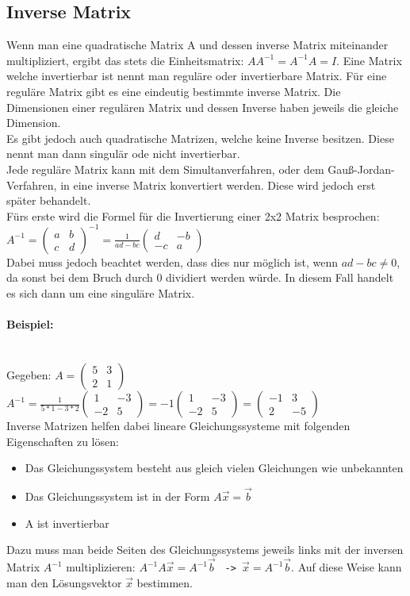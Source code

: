 \documentclass{article}
\newcommand{\paragraphlb}[1]{\paragraph{#1}\mbox{}\\}
\begin{document}
	\subsection{Inverse Matrix}
	Wenn man eine quadratische Matrix A und dessen inverse Matrix miteinander multipliziert, ergibt das stets die Einheitsmatrix: $AA^{-1}=A^{-1}A=I$. Eine Matrix welche invertierbar ist nennt man reguläre oder invertierbare Matrix. Für eine reguläre Matrix gibt es eine eindeutig bestimmte inverse Matrix. Die Dimensionen einer regulären Matrix und dessen Inverse haben jeweils die gleiche Dimension. \\
	Es gibt jedoch auch quadratische Matrizen, welche keine Inverse besitzen. Diese nennt man dann singulär ode nicht invertierbar. \\
	Jede reguläre Matrix kann mit dem Simultanverfahren, oder dem Gauß-Jordan-Verfahren, in eine inverse Matrix konvertiert werden. Diese wird jedoch erst später behandelt. \\
	Fürs erste wird die Formel für die Invertierung einer 2x2 Matrix besprochen: $A^{-1}=\begin{pmatrix} a & b \\ c & d \end{pmatrix}^{-1}=\frac{1}{ad-bc}\begin{pmatrix} d & -b \\ -c & a \end{pmatrix}$ \\
	Dabei muss jedoch beachtet werden, dass dies nur möglich ist, wenn $ad-bc\ne 0$, da sonst bei dem Bruch durch 0 dividiert werden würde. In diesem Fall handelt es sich dann um eine singuläre Matrix.
	\paragraphlb{Beispiel:}
	Gegeben: $A=\begin{pmatrix} 5 & 3 \\ 2 & 1 \end{pmatrix}$ \\
	$A^{-1}=\frac{1}{5*1-3*2}\begin{pmatrix} 1 & -3 \\ -2 & 5 \end{pmatrix}=-1 \begin{pmatrix} 1 & -3 \\ -2 & 5 \end{pmatrix}=\begin{pmatrix} -1 & 3 \\ 2 & -5 \end{pmatrix}$ \\
	Inverse Matrizen helfen dabei lineare Gleichungssysteme mit folgenden Eigenschaften zu lösen:
	\begin{itemize}
		\item{Das Gleichungssystem besteht aus gleich vielen Gleichungen wie unbekannten}
		\item{Das Gleichungssystem ist in der Form $A \vec{x}=\vec{b}$}
		\item{A ist invertierbar}
	\end{itemize}
	Dazu muss man beide Seiten des Gleichungssystems jeweils links mit der inversen Matrix $A^{-1}$ multiplizieren: $A^{-1}A \vec{x}=A^{-1}\vec{b}$ \texttt{ -> }$\vec{x}=A^{-1}\vec{b}$. Auf diese Weise kann man den Lösungsvektor $\vec{x}$ bestimmen.
\end{document}
